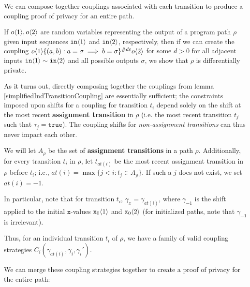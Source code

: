 We can compose together couplings associated with each transition to produce a coupling proof of privacy for an entire path. 

If $o\langle1 \rangle, o\langle2 \rangle$ are random variables representing the output of a program path $\rho$ given input sequences $\texttt{in}\langle1 \rangle$ and $\texttt{in}\langle2 \rangle$, respectively, 
then if we can create the coupling $o\langle1 \rangle\{(a, b): a=\sigma\implies b=\sigma\}^{\#d\varepsilon}o\langle2 \rangle$ for some $d>0$ for all adjacent inputs $\texttt{in}\langle1 \rangle\sim\texttt{in}\langle2 \rangle$ and all possible outputs $\sigma$, we show that $\rho$ is differentially private.

As it turns out, directly composing together the couplings from lemma \ref{simplifiedIndTransitionCoupling} are essentially sufficient; the constraints imposed upon shifts for a coupling for transition $t_i$ depend solely on the shift at the most recent \textbf{assignment transition} in $\rho$ (i.e. the most recent transition $t_j$ such that $\tau_j = \texttt{true}$). 
The coupling shifts for \textit{non-assignment transitions} can thus never impact each other. 

We will let $A_\rho$ be the set of \textbf{assignment transitions} in a path $\rho$. Additionally, for every transition $t_i$ in $\rho$, let $t_{at(i)}$ be the most recent assignment transition in $\rho$ before $t_i$; i.e., $at(i) = \max\{j<i: t_j\in A_\rho\}$. If such a $j$ does not exist, we set $at(i)=-1$. 

In particular, note that for transition $t_i$, $\gamma_x = \gamma_{at(i)}$, where $\gamma_{-1}$ is the shift applied to the initial $\texttt{x}$-values $\texttt{x}_0\langle1 \rangle$ and $\texttt{x}_0\langle2 \rangle$ (for initialized paths, note that $\gamma_{-1}$ is irrelevant).

Thus, for an individual transition $t_i$ of $\rho$, we have a family of valid coupling strategies $C_i(\gamma_{at(i)}, \gamma_i, \gamma_i')$. 

We can merge these coupling strategies together to create a proof of privacy for the entire path: 

